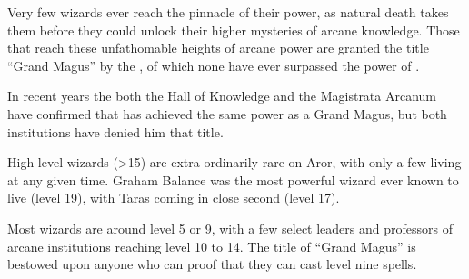 Very few wizards ever reach the pinnacle of their power, as natural death
takes them before they could unlock their higher mysteries of arcane
knowledge. Those that reach these unfathomable heights of arcane power are
granted the title ``Grand Magus'' by the ,
of which none have ever surpassed the power of .

In recent years the both the Hall of Knowledge and the Magistrata Arcanum
have confirmed that  has achieved the same power as a
Grand Magus, but both institutions have denied him that title.

\begin{note}
  High level wizards (>15) are extra-ordinarily rare on Aror, with only a few
  living at any given time. Graham Balance was the most powerful wizard ever
  known to live (level 19), with Taras coming in close second (level 17).

  Most wizards are around level 5 or 9, with a few select leaders and professors
  of arcane institutions reaching level 10 to 14. The title of ``Grand Magus''
  is bestowed upon anyone who can proof that they can cast level nine spells.
\end{note}
